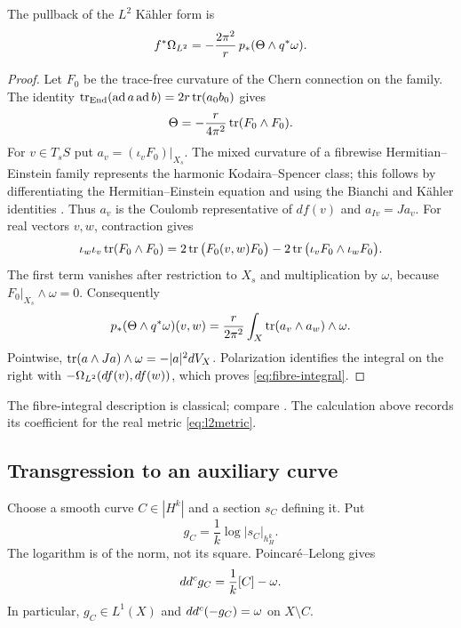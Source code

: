\begin{lemma}\label{lem:fibre-integral}
The pullback of the $L^2$ K\"ahler form is
\begin{equation}\label{eq:fibre-integral}
 f^*\Omega_{L^2}=-\frac{2\pi^2}{r}\,p_*(\Theta\wedge q^*\omega).
\end{equation}
\end{lemma}
\begin{proof}
Let $F_0$ be the trace-free curvature of the Chern connection on the family.
The identity
$\operatorname{tr}_{\operatorname{End}}(\operatorname{ad}a\operatorname{ad}b)=2r\operatorname{tr}(a_0b_0)$ gives
\[
 \Theta=-\frac{r}{4\pi^2}\operatorname{tr}(F_0\wedge F_0).
\]
For $v\in T_sS$ put $a_v=(\iota_vF_0)|_{X_s}$.
The mixed curvature of a fibrewise Hermitian--Einstein family represents
the harmonic Kodaira--Spencer class; this follows by differentiating the
Hermitian--Einstein equation and using the Bianchi and K\"ahler identities
\cite[Proposition~1]{ST92}. Thus $a_v$ is the Coulomb representative of
$df(v)$ and $a_{Iv}=Ja_v$.
For real vectors $v,w$, contraction gives
\[
 \iota_w\iota_v\operatorname{tr}(F_0\wedge F_0)
 =2\operatorname{tr}\big(F_0(v,w)F_0\big)
  -2\operatorname{tr}\big(\iota_vF_0\wedge\iota_wF_0\big).
\]
The first term vanishes after restriction to $X_s$ and multiplication by
$\omega$, because $F_0|_{X_s}\wedge\omega=0$. Consequently
\[
 p_*(\Theta\wedge q^*\omega)(v,w)
 =\frac{r}{2\pi^2}\int_X\operatorname{tr}(a_v\wedge a_w)\wedge\omega.
\]
Pointwise, $\operatorname{tr}(a\wedge Ja)\wedge\omega=-|a|^2dV_X$.
Polarization identifies the integral on the right with $-\Omega_{L^2}(df(v),df(w))$,
which proves \eqref{eq:fibre-integral}.
\end{proof}

The fibre-integral description is classical; compare
\cite[Proposition~4.3]{BS16}. The calculation above records its coefficient
for the real metric \eqref{eq:l2metric}.

\subsection{Transgression to an auxiliary curve}
Choose a smooth curve $C\in|H^k|$ and a section $s_C$ defining it. Put
\begin{equation}\label{eq:green}
 g_C=\frac1k\log|s_C|_{h_H^k}.
\end{equation}
The logarithm is of the norm, not its square. Poincar\'e--Lelong gives
\begin{equation}\label{eq:pl}
 dd^c g_C=\frac1k[C]-\omega.
\end{equation}
In particular, $g_C\in L^1(X)$ and $dd^c(-g_C)=\omega$ on $X\setminus C$.

